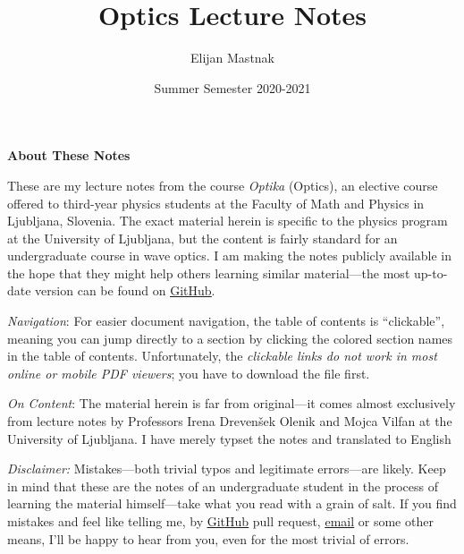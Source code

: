 \documentclass[11pt, a4paper]{article}
\begin{document}
\title{Optics Lecture Notes}
\author{Elijan Mastnak}
\date{Summer Semester 2020-2021}
\maketitle

\thispagestyle{empty}  %

\begin{center}
\textbf{About These Notes}
\end{center}
These are my lecture notes from the course \textit{Optika} (Optics), an elective course offered to third-year physics students at the Faculty of Math and Physics in Ljubljana, Slovenia. The exact material herein is specific to the physics program at the University of Ljubljana, but the content is fairly standard for an undergraduate course in wave optics. I am making the notes publicly available in the hope that they might help others learning similar material---the most up-to-date version can be found on \href{https://github.com/ejmastnak/fmf/tree/main/optics/}{\underline{GitHub}}.

\vspace{2mm}
\textit{Navigation}: For easier document navigation, the table of contents is ``clickable'', meaning you can jump directly to a section by clicking the colored section names in the table of contents. Unfortunately, the \textit{clickable links do not work in most online or mobile PDF viewers}; you have to download the file first.

\vspace{2mm}
\textit{On Content}: The material herein is far from original---it comes almost exclusively from lecture notes by Professors Irena Dreven\v{s}ek Olenik and Mojca Vilfan at the University of Ljubljana. I have merely  typset the notes and translated to English 

\vspace{2mm}
\textit{Disclaimer:} Mistakes---both trivial typos and legitimate errors---are likely. Keep in mind that these are the notes of an undergraduate student in the process of learning the material himself---take what you read with a grain of salt. If you find mistakes and feel like telling me, by \href{https://github.com/ejmastnak/fmf}{\underline{GitHub}} pull request, \href{mailto:ejmastnak@gmail.com}{\underline{email}} or some other means, I'll be happy to hear from you, even for the most trivial of errors.

\newpage
\end{document}
